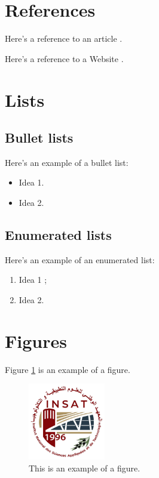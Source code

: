 \documentclass[12pt,a4paper,oneside,english]{book}
\begin{document}
{\section{References}
Here's a reference to an article \cite{fisher1936use}.

Here's a reference to a Website \cite{insat}.

\section{Lists}
\subsection{Bullet lists}
Here's an example of a bullet list:
\begin{itemize}
\item Idea 1.
\item Idea 2.
\end{itemize}
\medskip \par

\subsection{Enumerated lists}
Here's an example of an enumerated list:
\begin{enumerate}
\item Idea 1 ;
\item Idea 2.
\end{enumerate}
\medskip \par

\section{Figures}
Figure \ref{fig:exemple1} is an example of a figure.
\begin{figure}[!h]
\centering
\includegraphics[width=0.3\textwidth]{images/INSAT.jpg}
\caption{This is an example of a figure.}
\label{fig:exemple1}
\end{figure}

}
\end{document}
